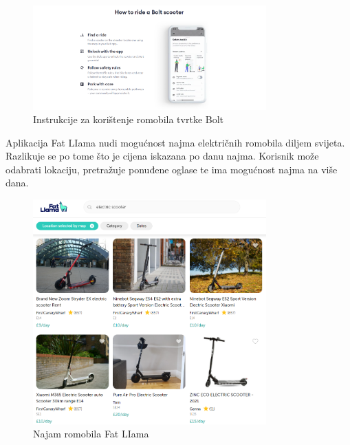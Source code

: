 		\begin{figure}[t]
			\centering
			\includegraphics[width=0.8\textwidth]{slike/bolt-2.png}
			\caption{Instrukcije za korištenje romobila tvrtke Bolt}
			\label{fig:bolt-2}
		\end{figure}
		
		\indent Aplikacija Fat LIama nudi mogućnost najma električnih romobila diljem svijeta. Razlikuje se po tome što je cijena iskazana po danu najma. Korisnik može odabrati lokaciju, pretražuje ponuđene oglase te ima mogućnost najma na više dana.\\
		
		\begin{figure}[t]
			\centering
			\includegraphics[width=0.8\textwidth]{slike/fat-liam.png}
			\caption{Najam romobila Fat LIama}
			\label{fig:fat-liama}
		\end{figure}
		
		

		
		
		
		
	